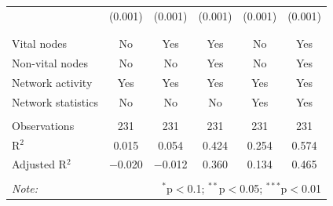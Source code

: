 \begin{table}[!htbp]
\begin{tabular}{@{\extracolsep{5pt}}lccccc}
  & (0.001) & (0.001) & (0.001) & (0.001) & (0.001) \\ 
  & & & & & \\ 
\hline \\[-1.8ex] 
Vital nodes & No & Yes & Yes & No & Yes \\ 
Non-vital nodes & No & No & Yes & No & Yes \\ 
Network activity & Yes & Yes & Yes & Yes & Yes \\ 
Network statistics & No & No & No & Yes & Yes \\ 
\hline &  &  &  &  &  \\ 
Observations & 231 & 231 & 231 & 231 & 231 \\ 
R$^{2}$ & 0.015 & 0.054 & 0.424 & 0.254 & 0.574 \\ 
Adjusted R$^{2}$ & $-$0.020 & $-$0.012 & 0.360 & 0.134 & 0.465 \\ 
\hline 
\hline \\[-1.8ex] 
\textit{Note:}  & \multicolumn{5}{r}{$^{*}$p$<$0.1; $^{**}$p$<$0.05; $^{***}$p$<$0.01} \\ 
\end{tabular} 
\end{table} 
